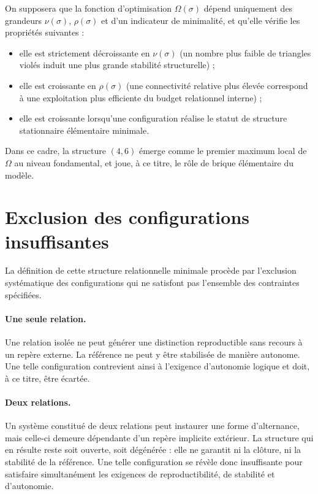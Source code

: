 \documentclass[11pt,a4paper]{article}
\begin{document}
On supposera que la fonction d’optimisation \(\Omega\left(\sigma\right)\) dépend uniquement des grandeurs \(\nu\left(\sigma\right)\), \(\rho\left(\sigma\right)\) et d’un indicateur de minimalité, et qu’elle vérifie les propriétés suivantes :
\begin{itemize}
  \item elle est strictement décroissante en \(\nu\left(\sigma\right)\) (un nombre plus faible de triangles violés induit une plus grande stabilité structurelle) ;
  \item elle est croissante en \(\rho\left(\sigma\right)\) (une connectivité relative plus élevée correspond à une exploitation plus efficiente du budget relationnel interne) ;
  \item elle est croissante lorsqu’une configuration réalise le statut de structure stationnaire élémentaire minimale.
\end{itemize}

Dans ce cadre, la structure \(\left(4,6\right)\) émerge comme le premier maximum local de \(\Omega\) au niveau fondamental, et joue, à ce titre, le rôle de brique élémentaire du modèle.

\section{Exclusion des configurations insuffisantes}

La définition de cette structure relationnelle minimale procède par l’exclusion systématique des configurations qui ne satisfont pas l’ensemble des contraintes spécifiées.

\paragraph{Une seule relation.}
Une relation isolée ne peut générer une distinction reproductible sans recours à un repère externe. La référence ne peut y être stabilisée de manière autonome. Une telle configuration contrevient ainsi à l’exigence d’autonomie logique et doit, à ce titre, être écartée.

\paragraph{Deux relations.}
Un système constitué de deux relations peut instaurer une forme d’alternance, mais celle-ci demeure dépendante d’un repère implicite extérieur. La structure qui en résulte reste soit ouverte, soit dégénérée : elle ne garantit ni la clôture, ni la stabilité de la référence. Une telle configuration se révèle donc insuffisante pour satisfaire simultanément les exigences de reproductibilité, de stabilité et d’autonomie.
\end{document}
